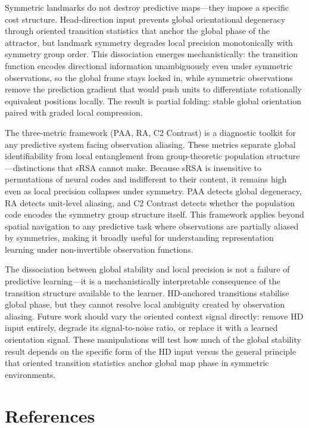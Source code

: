 \documentclass[11pt, a4paper]{article}
\begin{document}
Symmetric landmarks do not destroy predictive maps---they impose a specific cost structure. Head-direction input prevents global orientational degeneracy through oriented transition statistics that anchor the global phase of the attractor, but landmark symmetry degrades local precision monotonically with symmetry group order. This dissociation emerges mechanistically: the transition function encodes directional information unambiguously even under symmetric observations, so the global frame stays locked in, while symmetric observations remove the prediction gradient that would push units to differentiate rotationally equivalent positions locally. The result is partial folding: stable global orientation paired with graded local compression.

The three-metric framework (PAA, RA, C2 Contrast) is a diagnostic toolkit for any predictive system facing observation aliasing. These metrics separate global identifiability from local entanglement from group-theoretic population structure---distinctions that sRSA cannot make. Because sRSA is insensitive to permutations of neural codes and indifferent to their content, it remains high even as local precision collapses under symmetry. PAA detects global degeneracy, RA detects unit-level aliasing, and C2 Contrast detects whether the population code encodes the symmetry group structure itself. This framework applies beyond spatial navigation to any predictive task where observations are partially aliased by symmetries, making it broadly useful for understanding representation learning under non-invertible observation functions.

The dissociation between global stability and local precision is not a failure of predictive learning---it is a mechanistically interpretable consequence of the transition structure available to the learner. HD-anchored transitions stabilise global phase, but they cannot resolve local ambiguity created by observation aliasing. Future work should vary the oriented context signal directly: remove HD input entirely, degrade its signal-to-noise ratio, or replace it with a learned orientation signal. These manipulations will test how much of the global stability result depends on the specific form of the HD input versus the general principle that oriented transition statistics anchor global map phase in symmetric environments.

\clearpage

\section*{References}



\end{document}
